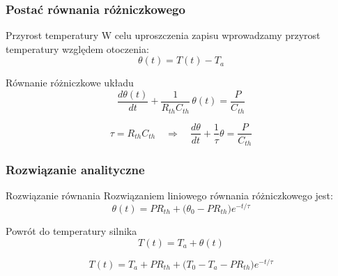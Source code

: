 \documentclass[10pt, aspectratio=169, t]{beamer}
\begin{document}
\begin{frame}
	\frametitle{Postać równania różniczkowego}
	
	\begin{block}{Przyrost temperatury}
		W celu uproszczenia zapisu wprowadzamy przyrost temperatury
		względem otoczenia:
		\[
		\theta(t) = T(t) - T_a
		\]
	\end{block}
	
	\vspace{0.2cm}
	
	\begin{block}{Równanie różniczkowe układu}
		\[
		\frac{d\theta(t)}{dt}
		+
		\frac{1}{R_{th} C_{th}} \, \theta(t)
		=
		\frac{P}{C_{th}}
		\]
	\end{block}
	
	\vspace{0.1cm}
	
	\begin{center}
		\small
		\[
		\tau = R_{th} C_{th}
		\quad \Rightarrow \quad
		\frac{d\theta}{dt} + \frac{1}{\tau}\theta = \frac{P}{C_{th}}
		\]
	\end{center}
	
\end{frame}

\begin{frame}
	\frametitle{Rozwiązanie analityczne}
	
	\begin{block}{Rozwiązanie równania}
		Rozwiązaniem liniowego równania różniczkowego jest:
		\[
		\theta(t)
		=
		P R_{th}
		+
		\bigl(\theta_0 - P R_{th}\bigr)
		e^{-t/\tau}
		\]
	\end{block}
	
	\vspace{0.2cm}
	
	\begin{block}{Powrót do temperatury silnika}
		\[
		T(t) = T_a + \theta(t)
		\]
	\end{block}
	
	\vspace{0.1cm}
	
	\begin{center}
		\small
		\[
		\boxed{
			T(t)
			=
			T_a + P R_{th}
			+
			\bigl(T_0 - T_a - P R_{th}\bigr)
			e^{-t/\tau}
		}
		\]
	\end{center}
	
\end{frame}
\end{document}
